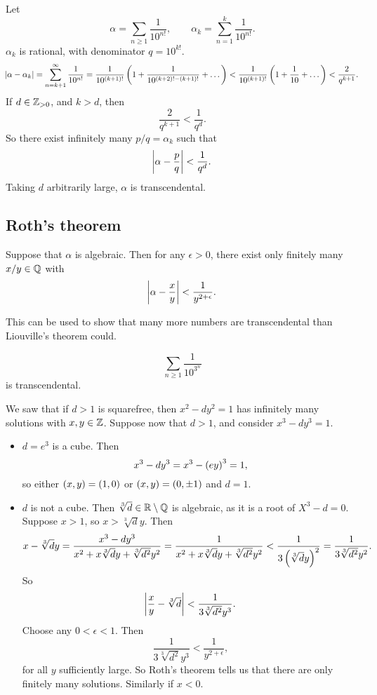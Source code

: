 \pagebreak

\begin{example*}
Let
$$ \alpha = \sum_{n \ge 1} \dfrac{1}{10^{n!}}, \qquad \alpha_k = \sum_{n = 1}^k \dfrac{1}{10^{n!}}. $$
$ \alpha_k $ is rational, with denominator $ q = 10^{k!} $.
$$ \abs{\alpha - \alpha_k} = \sum_{n = k + 1}^\infty \dfrac{1}{10^{n!}} = \dfrac{1}{10^{\br{k + 1}!}}\br{1 + \dfrac{1}{10^{\br{k + 2}! - \br{k + 1}!}} + \dots} < \dfrac{1}{10^{\br{k + 1}!}}\br{1 + \dfrac{1}{10} + \dots} < \dfrac{2}{q^{k + 1}}. $$
If $ d \in \mathbb{Z}_{> 0} $, and $ k > d $, then
$$ \dfrac{2}{q^{k + 1}} < \dfrac{1}{q^d}. $$
So there exist infinitely many $ p / q = \alpha_k $ such that
$$ \abs{\alpha - \dfrac{p}{q}} < \dfrac{1}{q^d}. $$
Taking $ d $ arbitrarily large, $ \alpha $ is transcendental.
\end{example*}


\subsection{Roth's theorem}

\begin{theorem}
Suppose that $ \alpha $ is algebraic. Then for any $ \epsilon > 0 $, there exist only finitely many $ x / y \in \mathbb{Q} $ with
$$ \abs{\alpha - \dfrac{x}{y}} < \dfrac{1}{y^{2 + \epsilon}}. $$
\end{theorem}

This can be used to show that many more numbers are transcendental than Liouville's theorem could.

\begin{example*}
$$ \sum_{n \ge 1} \dfrac{1}{10^{3^n}} $$
is transcendental.
\end{example*}

\begin{example*}
We saw that if $ d > 1 $ is squarefree, then $ x^2 - dy^2 = 1 $ has infinitely many solutions with $ x, y \in \mathbb{Z} $. Suppose now that $ d > 1 $, and consider $ x^3 - dy^3 = 1 $.
\begin{itemize}
\item $ d = e^3 $ is a cube. Then
$$ x^3 - dy^3 = x^3 - \br{ey}^3 = 1, $$
so either $ \br{x, y} = \br{1, 0} $ or $ \br{x, y} = \br{0, \pm1} $ and $ d = 1 $.
\item $ d $ is not a cube. Then $ \sqrt[3]{d} \in \mathbb{R} \setminus \mathbb{Q} $ is algebraic, as it is a root of $ X^3 - d = 0 $. Suppose $ x > 1 $, so $ x > \sqrt[3]{d}y $. Then
$$ x - \sqrt[3]{d}y = \dfrac{x^3 - dy^3}{x^2 + x\sqrt[3]{d}y + \sqrt[3]{d^2}y^2} = \dfrac{1}{x^2 + x\sqrt[3]{d}y + \sqrt[3]{d^2}y^2} < \dfrac{1}{3\br{\sqrt[3]{d}y}^2} = \dfrac{1}{3\sqrt[3]{d^2}y^2}. $$
So
$$ \abs{\dfrac{x}{y} - \sqrt[3]{d}} < \dfrac{1}{3\sqrt[3]{d^2}y^3}. $$
Choose any $ 0 < \epsilon < 1 $. Then
$$ \dfrac{1}{3\sqrt[3]{d^2}y^3} < \dfrac{1}{y^{2 + \epsilon}}, $$
for all $ y $ sufficiently large. So Roth's theorem tells us that there are only finitely many solutions. Similarly if $ x < 0 $.
\end{itemize}
\end{example*}

